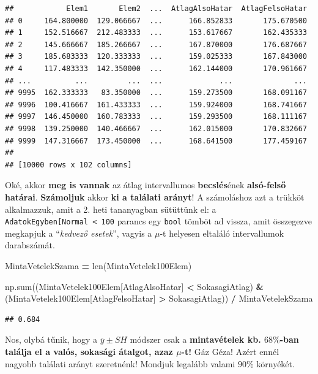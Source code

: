 \documentclass[
]{book}
\newenvironment{Shaded}{\begin{snugshade}}{\end{snugshade}}
\newcommand{\BuiltInTok}[1]{#1}
\newcommand{\NormalTok}[1]{#1}
\newcommand{\OperatorTok}[1]{\textcolor[rgb]{0.81,0.36,0.00}{\textbf{#1}}}
\newcommand{\StringTok}[1]{\textcolor[rgb]{0.31,0.60,0.02}{#1}}
\begin{document}
\begin{verbatim}
##            Elem1       Elem2  ...  AtlagAlsoHatar  AtlagFelsoHatar
## 0     164.800000  129.066667  ...      166.852833       175.670500
## 1     152.516667  212.483333  ...      153.617667       162.435333
## 2     145.666667  185.266667  ...      167.870000       176.687667
## 3     185.683333  120.333333  ...      159.025333       167.843000
## 4     117.483333  142.350000  ...      162.144000       170.961667
## ...          ...         ...  ...             ...              ...
## 9995  162.333333   83.350000  ...      159.273500       168.091167
## 9996  100.416667  161.433333  ...      159.924000       168.741667
## 9997  146.450000  160.783333  ...      159.293500       168.111167
## 9998  139.250000  140.466667  ...      162.015000       170.832667
## 9999  147.316667  173.450000  ...      168.641500       177.459167
## 
## [10000 rows x 102 columns]
\end{verbatim}

Oké, akkor \textbf{meg is vannak} az átlag intervallumos \textbf{becslés}ének \textbf{alsó-felső határai}. \textbf{Számoljuk} akkor \textbf{ki a találati arányt}!
A számoláshoz azt a trükköt alkalmazzuk, amit a 2. heti tananyagban sütüttünk el: a \texttt{AdatokEgyben{[}\textquotesingle{}Normal\textquotesingle{}{]}\ \textless{}\ 100} parancs egy \texttt{bool} tömböt ad vissza, amit összegezve megkapjuk a ``\emph{kedvező esetek}'', vagyis a \(\mu\)-t helyesen eltaláló intervallumok darabszámát.

\begin{Shaded}
\begin{Highlighting}[]
\NormalTok{MintaVetelekSzama }\OperatorTok{=} \BuiltInTok{len}\NormalTok{(MintaVetelek100Elem)}

\NormalTok{np.}\BuiltInTok{sum}\NormalTok{((MintaVetelek100Elem[}\StringTok{\textquotesingle{}AtlagAlsoHatar\textquotesingle{}}\NormalTok{] }\OperatorTok{\textless{}}\NormalTok{ SokasagiAtlag) }\OperatorTok{\&}\NormalTok{ (MintaVetelek100Elem[}\StringTok{\textquotesingle{}AtlagFelsoHatar\textquotesingle{}}\NormalTok{] }\OperatorTok{\textgreater{}}\NormalTok{ SokasagiAtlag)) }\OperatorTok{/}\NormalTok{ MintaVetelekSzama}
\end{Highlighting}
\end{Shaded}

\begin{verbatim}
## 0.684
\end{verbatim}

Nos, olybá tűnik, hogy a \(\bar{y} \pm SH\) módszer csak a \textbf{mintavételek kb. \(68\%\)-ban találja el a valós, sokasági átalgot, azaz \(\mu\)-t!} Gáz Géza! Azért ennél nagyobb találati arányt szeretnénk! Mondjuk legalább valami \(90\%\) környékét.
\end{document}
